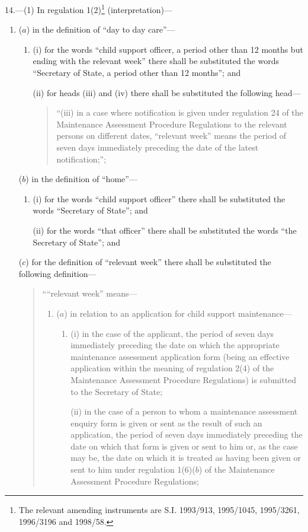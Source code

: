 \documentclass[12pt,a4paper]{article}
\begin{document}
14.—(1) In regulation 1(2)\footnote{\frenchspacing The relevant amending instruments are S.I. 1993/913, 1995/1045, 1995/3261, 1996/3196 and 1998/58.} (interpretation)—
\begin{enumerate}\item[]
($a$) in the definition of “day to day care”—
\begin{enumerate}\item[]
(i) for the words “child support officer, a period other than 12 months but ending with the relevant week” there shall be substituted the words “Secretary of State, a period other than 12 months”; and

(ii) for heads (iii) and (iv) there shall be substituted the following head—
\begin{quotation}
“(iii) in a case where notification is given under regulation 24 of the Maintenance Assessment Procedure Regulations to the relevant persons on different dates, “relevant week” means the period of seven days immediately preceding the date of the latest notification;”;
\end{quotation}
\end{enumerate}

($b$) in the definition of “home”—
\begin{enumerate}\item[]
(i) for the words “child support officer” there shall be substituted the words “Secretary of State”; and

(ii) for the words “that officer” there shall be substituted the words “the Secretary of State”; and
\end{enumerate}

($c$) for the definition of “relevant week” there shall be substituted the following definition—
\begin{quotation}
    ““relevant week” means—
\begin{enumerate}\item[]
    ($a$)
    in relation to an application for child support maintenance—
\begin{enumerate}\item[]
    (i)
    in the case of the applicant, the period of seven days immediately preceding the date on which the appropriate maintenance assessment application form (being an effective application within the meaning of regulation 2(4) of the Maintenance Assessment Procedure Regulations) is submitted to the Secretary of State;

    (ii)
    in the case of a person to whom a maintenance assessment enquiry form is given or sent as the result of such an application, the period of seven days immediately preceding the date on which that form is given or sent to him or, as the case may be, the date on which it is treated as having been given or sent to him under regulation 1(6)($b$) of the Maintenance Assessment Procedure Regulations;
\end{enumerate}


\end{enumerate}
\end{quotation}
\end{enumerate}
\end{document}
